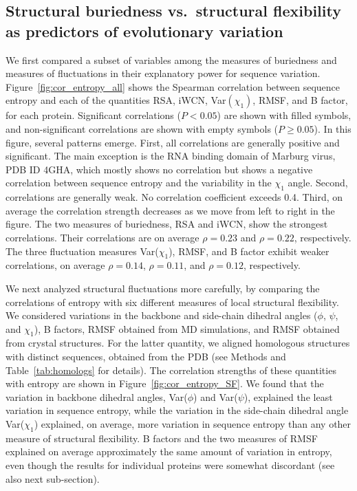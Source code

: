 \documentclass[12pt]{article}
\begin{document}
\subsection*{Structural buriedness vs.\ structural flexibility as predictors of evolutionary variation}

We first compared a subset of variables among the measures of buriedness and measures of fluctuations in their explanatory power for sequence variation. Figure~\ref{fig:cor_entropy_all} shows the Spearman correlation between sequence entropy and each of the quantities RSA, iWCN, Var$(\chi_1)$, RMSF, and B factor, for each protein. Significant correlations ($P<0.05$) are shown with filled symbols, and non-significant correlations are shown with empty symbols ($P\geq0.05$).
In this figure, several patterns emerge. First, all correlations are generally positive and significant. The main exception is the RNA binding domain of Marburg virus, PDB ID 4GHA, which mostly shows no correlation but shows a negative correlation between sequence entropy and the variability in the $\chi_1$ angle. Second, correlations are generally weak. No correlation coefficient exceeds 0.4. Third, on average the correlation strength decreases as we move from left to right in the figure. The two measures of buriedness, RSA and iWCN, show the strongest correlations. Their correlations are on average $\rho=0.23$ and $\rho=0.22$, respectively. The three fluctuation measures Var($\chi_1$), RMSF, and B factor exhibit weaker correlations, on average $\rho=0.14$, $\rho=0.11$, and $\rho=0.12$, respectively.

We next analyzed structural fluctuations more carefully, by comparing the correlations of entropy with six different measures of local structural flexibility.  We considered variations in the backbone and side-chain dihedral angles ($\phi$, $\psi$, and $\chi_1$), B factors, RMSF obtained from MD simulations, and RMSF obtained from crystal structures. For the latter quantity, we aligned homologous structures with distinct sequences, obtained from the PDB (see Methods and Table~\ref{tab:homologs} for details). The correlation strengths of these quantities with entropy are shown in Figure~\ref{fig:cor_entropy_SF}. We found that the variation in backbone dihedral angles, Var($\phi$) and Var($\psi$), explained the least variation in sequence entropy, while the variation in the side-chain dihedral angle Var($\chi_1$) explained, on average, more variation in sequence entropy than any other measure of structural flexibility. B factors and the two measures of RMSF explained on average approximately the same amount of variation in entropy, even though the results for individual proteins were somewhat discordant (see also next sub-section).
\end{document}
